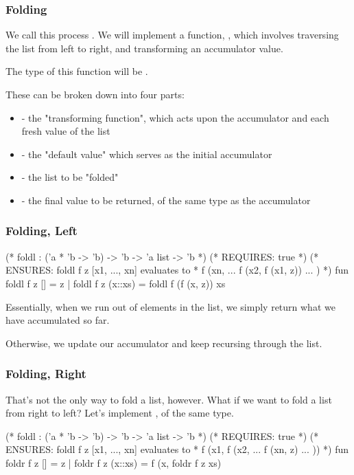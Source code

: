 \documentclass[aspectratio=169]{beamer}
\begin{document}
\begin{frame}[fragile]
  \frametitle{Folding}

  We call this process . We will implement a function, , which
  involves traversing the list from left to right, and transforming an accumulator
  value.

  The type of this function will be .

  These can be broken down into four parts:
  \begin{itemize}
    \item {} - the "transforming function", which acts upon the 
    accumulator and each fresh value of the list
    \item {} - the "default value" which serves as the initial accumulator
    \item {} - the list to be "folded"
    \item {} - the final value to be returned, of the same type as the accumulator
  \end{itemize}
\end{frame}

\begin{frame}[fragile]
  \frametitle{Folding, Left}

  \begin{codeblock}
    (* foldl : ('a * 'b -> 'b) -> 'b -> 'a list -> 'b *)
    (* REQUIRES: true *)
    (* ENSURES: foldl f z [x1, ..., xn] evaluates to 
     * f (xn, ... f (x2, f (x1, z)) ... ) *)
    fun foldl f z [] = z
      | foldl f z (x::xs) = foldl f (f (x, z)) xs  
  \end{codeblock}

  Essentially, when we run out of elements in the list, we simply return
  what we have accumulated so far.

  Otherwise, we update our accumulator and keep recursing through the list. 
\end{frame}

\begin{frame}[fragile]
  \frametitle{Folding, Right}

  That's not the only way to fold a list, however. What if we want to fold
  a list from right to left? Let's implement , of the same type.

  \begin{codeblock}
    (* foldl : ('a * 'b -> 'b) -> 'b -> 'a list -> 'b *)
    (* REQUIRES: true *)
    (* ENSURES: foldl f z [x1, ..., xn] evaluates to 
     * f (x1, f (x2, ... f (xn, z) ... )) *)
    fun foldr f z [] = z
      | foldr f z (x::xs) = f (x, foldr f z xs)
  \end{codeblock}
\end{frame}
\end{document}
